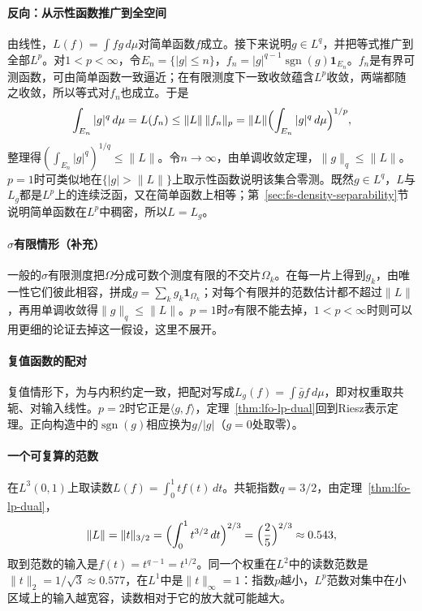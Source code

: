 \paragraph{反向：从示性函数推广到全空间}
由线性，$L(f)=\int fg\,d\mu$对简单函数$f$成立。接下来说明$g\in L^q$，并把等式推广到全部$L^p$。对$1<p<\infty$，令$E_n=\{|g|\leq n\}$，$f_n=|g|^{q-1}\operatorname{sgn}(g)\mathbf 1_{E_n}$。$f_n$是有界可测函数，可由简单函数一致逼近；在有限测度下一致收敛蕴含$L^p$收敛，两端都随之收敛，所以等式对$f_n$也成立。于是
\[
 \int_{E_n}|g|^q\,d\mu=L(f_n)\leq\|L\|\,\|f_n\|_p=\|L\|\Bigl(\int_{E_n}|g|^q\,d\mu\Bigr)^{1/p},
\]
整理得$(\int_{E_n}|g|^q)^{1/q}\leq\|L\|$。令$n\to\infty$，由单调收敛定理，$\|g\|_q\leq\|L\|$。$p=1$时可类似地在$\{|g|>\|L\|\}$上取示性函数说明该集合零测。既然$g\in L^q$，$L$与$L_g$都是$L^p$上的连续泛函，又在简单函数上相等；第~\ref{sec:fs-density-separability}节说明简单函数在$L^p$中稠密，所以$L=L_g$。

\paragraph{$\sigma$有限情形（补充）}
一般的$\sigma$有限测度把$\Omega$分成可数个测度有限的不交片$\Omega_k$。在每一片上得到$g_k$，由唯一性它们彼此相容，拼成$g=\sum_kg_k\mathbf 1_{\Omega_k}$；对每个有限并的范数估计都不超过$\|L\|$，再用单调收敛得$\|g\|_q\leq\|L\|$。$p=1$时$\sigma$有限不能去掉，$1<p<\infty$时则可以用更细的论证去掉这一假设，这里不展开。

\paragraph{复值函数的配对}
复值情形下，为与内积约定一致，把配对写成$L_g(f)=\int\bar gf\,d\mu$，即对权重取共轭、对输入线性。$p=2$时它正是$\langle g,f\rangle$，定理~\ref{thm:lfo-lp-dual}回到Riesz表示定理。正向构造中的$\operatorname{sgn}(g)$相应换为$g/|g|$（$g=0$处取零）。

\paragraph{一个可复算的范数}
在$L^3(0,1)$上取读数$L(f)=\int_0^1tf(t)\,dt$。共轭指数$q=3/2$，由定理~\ref{thm:lfo-lp-dual}，
\[
 \|L\|=\|t\|_{3/2}=\Bigl(\int_0^1t^{3/2}\,dt\Bigr)^{2/3}=\Bigl(\frac25\Bigr)^{2/3}\approx0.543 ,
\]
取到范数的输入是$f(t)=t^{q-1}=t^{1/2}$。同一个权重在$L^2$中的读数范数是$\|t\|_2=1/\sqrt3\approx0.577$，在$L^1$中是$\|t\|_\infty=1$：指数$p$越小，$L^p$范数对集中在小区域上的输入越宽容，读数相对于它的放大就可能越大。

